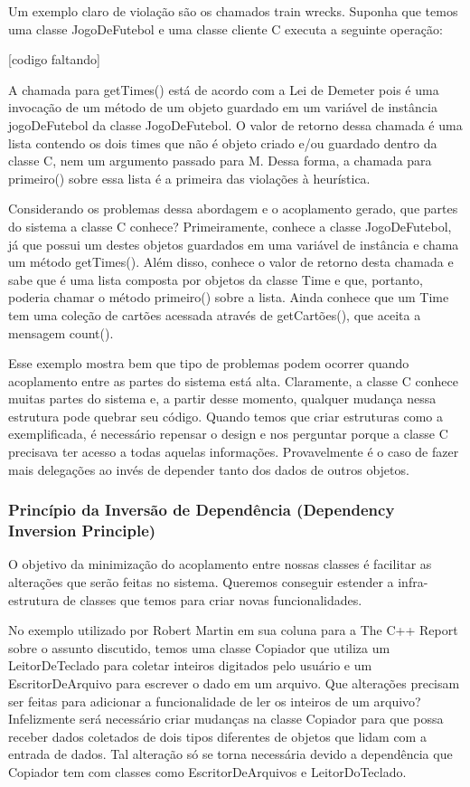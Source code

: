 	Um exemplo claro de violação são os chamados train wrecks. Suponha que temos uma classe JogoDeFutebol e uma classe cliente C executa a seguinte operação:
	
[codigo faltando]

	A chamada para getTimes() está de acordo com a Lei de Demeter pois é uma invocação de um método de um objeto guardado em um variável de instância jogoDeFutebol da classe JogoDeFutebol. O valor de retorno dessa chamada é uma lista contendo os dois times que não é objeto criado e/ou guardado dentro da classe C, nem um argumento passado para M. Dessa forma, a chamada para primeiro() sobre essa lista é a primeira das violações à heurística.
	
	Considerando os problemas dessa abordagem e o acoplamento gerado, que partes do sistema a classe C conhece? Primeiramente, conhece a classe JogoDeFutebol, já que possui um destes objetos guardados em uma variável de instância e chama um método getTimes(). Além disso, conhece o valor de retorno desta chamada e sabe que é uma lista composta por objetos da classe Time e que, portanto, poderia chamar o método primeiro() sobre a lista. Ainda conhece que um Time tem uma coleção de cartões acessada através de getCartões(), que aceita a mensagem count().
	
	Esse exemplo mostra bem que tipo de problemas podem ocorrer quando acoplamento entre as partes do sistema está alta. Claramente, a classe C conhece muitas partes do sistema e, a partir desse momento, qualquer mudança nessa estrutura pode quebrar seu código. Quando temos que criar estruturas como a exemplificada, é necessário repensar o design e nos perguntar porque a classe C precisava ter acesso a todas aquelas informações. Provavelmente é o caso de fazer mais delegações ao invés de depender tanto dos dados de outros objetos.

\subsubsection{Princípio da Inversão de Dependência (Dependency Inversion Principle)}
	O objetivo da minimização do acoplamento entre nossas classes é facilitar as alterações que serão feitas no sistema. Queremos conseguir estender a infra-estrutura de classes que temos para criar novas funcionalidades.
	
	No exemplo utilizado por Robert Martin em sua coluna para a The C++ Report sobre o assunto discutido, temos uma classe Copiador que utiliza um LeitorDeTeclado para coletar inteiros digitados pelo usuário e um EscritorDeArquivo para escrever o dado em um arquivo. Que alterações precisam ser feitas  para adicionar a funcionalidade de ler os inteiros de um arquivo? Infelizmente será necessário criar mudanças na classe Copiador para que possa receber dados coletados de dois tipos diferentes de objetos que lidam com a entrada de dados. Tal alteração só se torna necessária devido a dependência que Copiador tem com classes como EscritorDeArquivos e LeitorDoTeclado.
	
